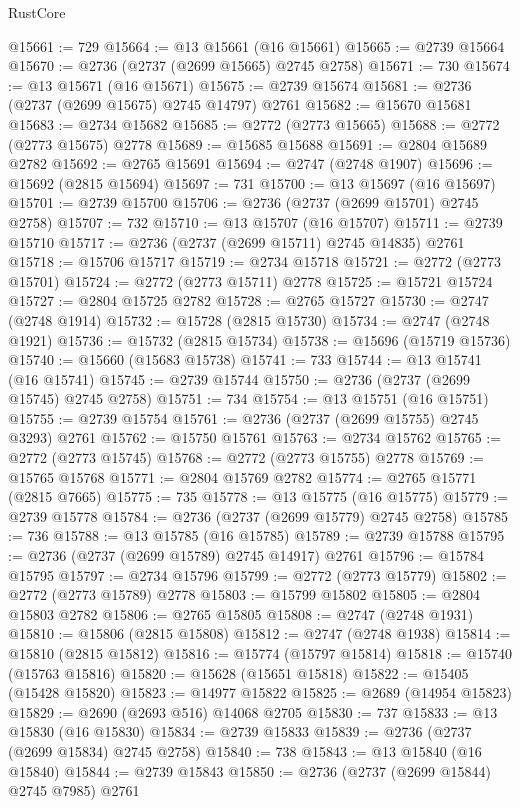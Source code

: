 \begin{lexlean}{RustCore}
\begin{coremodule}
@15661 := 729
@15664 := @13 @15661 (@16 @15661)
@15665 := @2739 @15664
@15670 := @2736 (@2737 (@2699 @15665) @2745 @2758)
@15671 := 730
@15674 := @13 @15671 (@16 @15671)
@15675 := @2739 @15674
@15681 := @2736 (@2737 (@2699 @15675) @2745 @14797) @2761
@15682 := @15670 @15681
@15683 := @2734 @15682
@15685 := @2772 (@2773 @15665)
@15688 := @2772 (@2773 @15675) @2778
@15689 := @15685 @15688
@15691 := @2804 @15689 @2782
@15692 := @2765 @15691
@15694 := @2747 (@2748 @1907)
@15696 := @15692 (@2815 @15694)
@15697 := 731
@15700 := @13 @15697 (@16 @15697)
@15701 := @2739 @15700
@15706 := @2736 (@2737 (@2699 @15701) @2745 @2758)
@15707 := 732
@15710 := @13 @15707 (@16 @15707)
@15711 := @2739 @15710
@15717 := @2736 (@2737 (@2699 @15711) @2745 @14835) @2761
@15718 := @15706 @15717
@15719 := @2734 @15718
@15721 := @2772 (@2773 @15701)
@15724 := @2772 (@2773 @15711) @2778
@15725 := @15721 @15724
@15727 := @2804 @15725 @2782
@15728 := @2765 @15727
@15730 := @2747 (@2748 @1914)
@15732 := @15728 (@2815 @15730)
@15734 := @2747 (@2748 @1921)
@15736 := @15732 (@2815 @15734)
@15738 := @15696 (@15719 @15736)
@15740 := @15660 (@15683 @15738)
@15741 := 733
@15744 := @13 @15741 (@16 @15741)
@15745 := @2739 @15744
@15750 := @2736 (@2737 (@2699 @15745) @2745 @2758)
@15751 := 734
@15754 := @13 @15751 (@16 @15751)
@15755 := @2739 @15754
@15761 := @2736 (@2737 (@2699 @15755) @2745 @3293) @2761
@15762 := @15750 @15761
@15763 := @2734 @15762
@15765 := @2772 (@2773 @15745)
@15768 := @2772 (@2773 @15755) @2778
@15769 := @15765 @15768
@15771 := @2804 @15769 @2782
@15774 := @2765 @15771 (@2815 @7665)
@15775 := 735
@15778 := @13 @15775 (@16 @15775)
@15779 := @2739 @15778
@15784 := @2736 (@2737 (@2699 @15779) @2745 @2758)
@15785 := 736
@15788 := @13 @15785 (@16 @15785)
@15789 := @2739 @15788
@15795 := @2736 (@2737 (@2699 @15789) @2745 @14917) @2761
@15796 := @15784 @15795
@15797 := @2734 @15796
@15799 := @2772 (@2773 @15779)
@15802 := @2772 (@2773 @15789) @2778
@15803 := @15799 @15802
@15805 := @2804 @15803 @2782
@15806 := @2765 @15805
@15808 := @2747 (@2748 @1931)
@15810 := @15806 (@2815 @15808)
@15812 := @2747 (@2748 @1938)
@15814 := @15810 (@2815 @15812)
@15816 := @15774 (@15797 @15814)
@15818 := @15740 (@15763 @15816)
@15820 := @15628 (@15651 @15818)
@15822 := @15405 (@15428 @15820)
@15823 := @14977 @15822
@15825 := @2689 (@14954 @15823)
@15829 := @2690 (@2693 @516) @14068 @2705
@15830 := 737
@15833 := @13 @15830 (@16 @15830)
@15834 := @2739 @15833
@15839 := @2736 (@2737 (@2699 @15834) @2745 @2758)
@15840 := 738
@15843 := @13 @15840 (@16 @15840)
@15844 := @2739 @15843
@15850 := @2736 (@2737 (@2699 @15844) @2745 @7985) @2761

\end{coremodule}
\end{lexlean}
